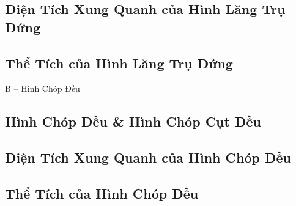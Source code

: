 \documentclass{article}
\numberwithin{equation}{section}
\begin{document}

\subsection{Diện Tích Xung Quanh của Hình Lăng Trụ Đứng}


\subsection{Thể Tích của Hình Lăng Trụ Đứng}


\begin{center}
	\Large B -- Hình Chóp Đều
\end{center}

\subsection{Hình Chóp Đều \& Hình Chóp Cụt Đều}


\subsection{Diện Tích Xung Quanh của Hình Chóp Đều}


\subsection{Thể Tích của Hình Chóp Đều}


\printbibliography[heading=bibintoc]
	
\end{document}
